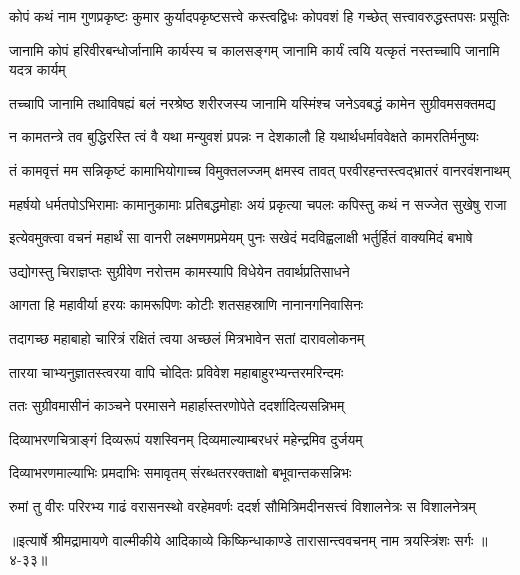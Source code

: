\twolineshloka
{कोपं कथं नाम गुणप्रकृष्टः कुमार कुर्यादपकृष्टसत्त्वे}
{कस्त्वद्विधः कोपवशं हि गच्छेत् सत्त्वावरुद्धस्तपसः प्रसूतिः} %

\twolineshloka
{जानामि कोपं हरिवीरबन्धोर्जानामि कार्यस्य च कालसङ्गम्}
{जानामि कार्यं त्वयि यत्कृतं नस्तच्चापि जानामि यदत्र कार्यम्} %

\twolineshloka
{तच्चापि जानामि तथाविषह्यं बलं नरश्रेष्ठ शरीरजस्य}
{जानामि यस्मिंश्च जनेऽवबद्धं कामेन सुग्रीवमसक्तमद्य} %

\twolineshloka
{न कामतन्त्रे तव बुद्धिरस्ति त्वं वै यथा मन्युवशं प्रपन्नः}
{न देशकालौ हि यथार्थधर्माववेक्षते कामरतिर्मनुष्यः} %

\twolineshloka
{तं कामवृत्तं मम सन्निकृष्टं कामाभियोगाच्च विमुक्तलज्जम्}
{क्षमस्व तावत् परवीरहन्तस्त्वद्भ्रातरं वानरवंशनाथम्} %

\twolineshloka
{महर्षयो धर्मतपोऽभिरामाः कामानुकामाः प्रतिबद्धमोहाः}
{अयं प्रकृत्या चपलः कपिस्तु कथं न सज्जेत सुखेषु राजा} %

\twolineshloka
{इत्येवमुक्त्वा वचनं महार्थं सा वानरी लक्ष्मणमप्रमेयम्}
{पुनः सखेदं मदविह्वलाक्षी भर्तुर्हितं वाक्यमिदं बभाषे} %

\twolineshloka
{उद्योगस्तु चिराज्ञप्तः सुग्रीवेण नरोत्तम}
{कामस्यापि विधेयेन तवार्थप्रतिसाधने} %

\twolineshloka
{आगता हि महावीर्या हरयः कामरूपिणः}
{कोटीः शतसहस्राणि नानानगनिवासिनः} %

\twolineshloka
{तदागच्छ महाबाहो चारित्रं रक्षितं त्वया}
{अच्छलं मित्रभावेन सतां दारावलोकनम्} %

\twolineshloka
{तारया चाभ्यनुज्ञातस्त्वरया वापि चोदितः}
{प्रविवेश महाबाहुरभ्यन्तरमरिन्दमः} %

\twolineshloka
{ततः सुग्रीवमासीनं काञ्चने परमासने}
{महार्हास्तरणोपेते ददर्शादित्यसन्निभम्} %

\twolineshloka
{दिव्याभरणचित्राङ्गं दिव्यरूपं यशस्विनम्}
{दिव्यमाल्याम्बरधरं महेन्द्रमिव दुर्जयम्} %

\twolineshloka
{दिव्याभरणमाल्याभिः प्रमदाभिः समावृतम्}
{संरब्धतररक्ताक्षो बभूवान्तकसन्निभः} %

\twolineshloka
{रुमां तु वीरः परिरभ्य गाढं वरासनस्थो वरहेमवर्णः}
{ददर्श सौमित्रिमदीनसत्त्वं विशालनेत्रः स विशालनेत्रम्} %


॥इत्यार्षे श्रीमद्रामायणे वाल्मीकीये आदिकाव्ये किष्किन्धाकाण्डे तारासान्त्ववचनम् नाम त्रयस्त्रिंशः सर्गः ॥४-३३॥
